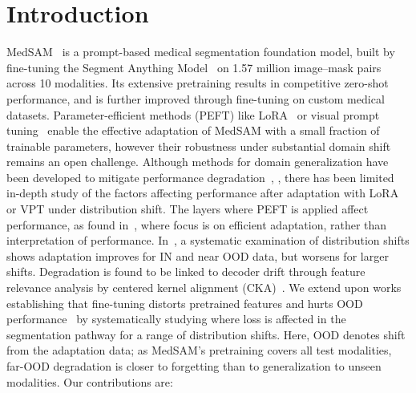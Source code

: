 \documentclass[runningheads]{llncs}
\begin{document}
\section{Introduction}
\label{sec:intro}

MedSAM~\cite{ma2024medsam} is a prompt-based medical segmentation foundation model, built by fine-tuning the Segment Anything Model~\cite{kirillov2023sam} on 1.57 million image--mask pairs across 10 modalities. Its extensive pretraining results in competitive zero-shot performance, and is further improved through fine-tuning on custom medical datasets. Parameter-efficient methods (PEFT) like LoRA~\cite{hu2022lora} or visual prompt tuning~\cite{jia2022vpt} enable the effective adaptation of MedSAM with a small fraction of trainable parameters, however their robustness under substantial domain shift remains an open challenge. Although methods for domain generalization have been developed to mitigate performance degradation~\cite{wei2024prompting}, \cite{dong2024sdp}, there has been limited in-depth study of the factors affecting performance after adaptation with LoRA or VPT under distribution shift. The layers where PEFT is applied affect performance, as found in~\cite{teuber2026peft}, where focus is on efficient adaptation, rather than interpretation of performance. In~\cite{prior2026safer}, a systematic examination of distribution shifts shows adaptation improves for IN and near OOD data, but worsens for larger shifts. Degradation is found to be linked to decoder drift through feature relevance analysis by centered kernel alignment (CKA)~\cite{kornblith2019cka}. We extend upon works establishing that fine-tuning distorts pretrained features and hurts OOD performance~\cite{kumar2022finetuning,tan2024protection} by systematically studying where loss is affected in the segmentation pathway for a range of distribution shifts. Here, OOD denotes shift from the adaptation data; as MedSAM's pretraining covers all test modalities, far-OOD degradation is closer to forgetting than to generalization to unseen modalities. Our contributions are:
\end{document}
